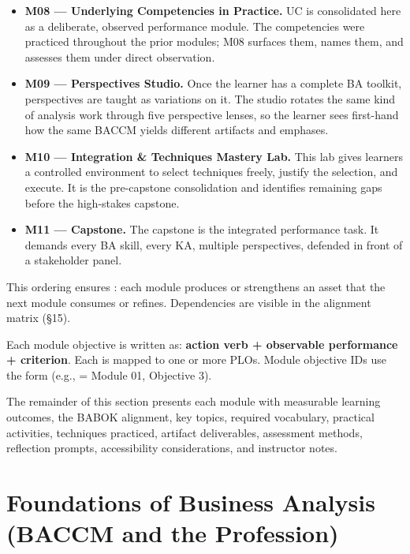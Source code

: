 \documentclass[11pt,letterpaper,oneside]{report}
\begin{document}
\begin{itemize}
  \item \textbf{M08 --- Underlying Competencies in Practice.} UC is consolidated here as a deliberate, observed performance module. The competencies were practiced throughout the prior modules; M08 surfaces them, names them, and assesses them under direct observation.
  \item \textbf{M09 --- Perspectives Studio.} Once the learner has a complete BA toolkit, perspectives are taught as variations on it. The studio rotates the same kind of analysis work through five perspective lenses, so the learner sees first-hand how the same BACCM yields different artifacts and emphases.
  \item \textbf{M10 --- Integration \& Techniques Mastery Lab.} This lab gives learners a controlled environment to select techniques freely, justify the selection, and execute. It is the pre-capstone consolidation and identifies remaining gaps before the high-stakes capstone.
  \item \textbf{M11 --- Capstone.} The capstone is the integrated performance task. It demands every BA skill, every KA, multiple perspectives, defended in front of a stakeholder panel.
\end{itemize}

This ordering ensures : each module produces or strengthens an asset that the next module consumes or refines. Dependencies are visible in the alignment matrix (\S15).

\begin{curriculumnote}
Each module objective is written as: \textbf{action verb + observable performance + criterion}. Each is mapped to one or more PLOs. Module objective IDs use the form  (e.g.,  = Module 01, Objective 3).
\end{curriculumnote}


The remainder of this section presents each module with measurable learning outcomes, the BABOK alignment, key topics, required vocabulary, practical activities, techniques practiced, artifact deliverables, assessment methods, reflection prompts, accessibility considerations, and instructor notes.

\chapter{Foundations of Business Analysis (BACCM and the Profession)}
\end{document}
